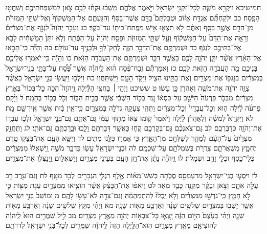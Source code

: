 \documentclass[twoside, openany, parskip=half, 11pt]{book}
\begin{document}
חמישיכא וַיִּקְרָ֥א מֹשֶׁ֛ה לְכׇל־זִקְנֵ֥י יִשְׂרָאֵ֖ל וַיֹּ֣אמֶר אֲלֵהֶ֑ם מִֽשְׁכ֗וּ וּקְח֨וּ לָכֶ֥ם צֹ֛אן לְמִשְׁפְּחֹתֵיכֶ֖ם וְשַׁחֲט֥וּ הַפָּֽסַח׃ כב וּלְקַחְתֶּ֞ם אֲגֻדַּ֣ת אֵז֗וֹב וּטְבַלְתֶּם֮ בַּדָּ֣ם אֲשֶׁר־בַּסַּף֒ וְהִגַּעְתֶּ֤ם אֶל־הַמַּשְׁקוֹף֙ וְאֶל־שְׁתֵּ֣י הַמְּזוּזֹ֔ת מִן־הַדָּ֖ם אֲשֶׁ֣ר בַּסָּ֑ף וְאַתֶּ֗ם לֹ֥א תֵצְא֛וּ אִ֥ישׁ מִפֶּֽתַח־בֵּית֖וֹ עַד־בֹּֽקֶר׃ כג וְעָבַ֣ר יְהֹוָה֮ לִנְגֹּ֣ף אֶת־מִצְרַ֒יִם֒ וְרָאָ֤ה אֶת־הַדָּם֙ עַל־הַמַּשְׁק֔וֹף וְעַ֖ל שְׁתֵּ֣י הַמְּזוּזֹ֑ת וּפָסַ֤ח יְהֹוָה֙ עַל־הַפֶּ֔תַח וְלֹ֤א יִתֵּן֙ הַמַּשְׁחִ֔ית לָבֹ֥א אֶל־בָּתֵּיכֶ֖ם לִנְגֹּֽף׃ כד וּשְׁמַרְתֶּ֖ם אֶת־הַדָּבָ֣ר הַזֶּ֑ה לְחׇק־לְךָ֥ וּלְבָנֶ֖יךָ עַד־עוֹלָֽם׃ כה וְהָיָ֞ה כִּֽי־תָבֹ֣אוּ אֶל־הָאָ֗רֶץ אֲשֶׁ֨ר יִתֵּ֧ן יְהֹוָ֛ה לָכֶ֖ם כַּאֲשֶׁ֣ר דִּבֵּ֑ר וּשְׁמַרְתֶּ֖ם אֶת־הָעֲבֹדָ֥ה הַזֹּֽאת׃ כו וְהָיָ֕ה כִּֽי־יֹאמְר֥וּ אֲלֵיכֶ֖ם בְּנֵיכֶ֑ם מָ֛ה הָעֲבֹדָ֥ה הַזֹּ֖את לָכֶֽם׃ כז וַאֲמַרְתֶּ֡ם זֶֽבַח־פֶּ֨סַח ה֜וּא לַֽיהֹוָ֗ה אֲשֶׁ֣ר פָּ֠סַ֠ח עַל־בָּתֵּ֤י בְנֵֽי־יִשְׂרָאֵל֙ בְּמִצְרַ֔יִם בְּנׇגְפּ֥וֹ אֶת־מִצְרַ֖יִם וְאֶת־בָּתֵּ֣ינוּ הִצִּ֑יל וַיִּקֹּ֥ד הָעָ֖ם וַיִּֽשְׁתַּחֲוֽוּ׃ כח וַיֵּלְכ֥וּ וַיַּֽעֲשׂ֖וּ בְּנֵ֣י יִשְׂרָאֵ֑ל כַּאֲשֶׁ֨ר צִוָּ֧ה יְהֹוָ֛ה אֶת־מֹשֶׁ֥ה וְאַהֲרֹ֖ן כֵּ֥ן עָשֽׂוּ׃
ט ששיכט וַיְהִ֣י ׀ בַּחֲצִ֣י הַלַּ֗יְלָה וַֽיהֹוָה֮ הִכָּ֣ה כׇל־בְּכוֹר֮ בְּאֶ֣רֶץ מִצְרַ֒יִם֒ מִבְּכֹ֤ר פַּרְעֹה֙ הַיֹּשֵׁ֣ב עַל־כִּסְא֔וֹ עַ֚ד בְּכ֣וֹר הַשְּׁבִ֔י אֲשֶׁ֖ר בְּבֵ֣ית הַבּ֑וֹר וְכֹ֖ל בְּכ֥וֹר בְּהֵמָֽה׃ ל וַיָּ֨קׇם פַּרְעֹ֜ה לַ֗יְלָה ה֤וּא וְכׇל־עֲבָדָיו֙ וְכׇל־מִצְרַ֔יִם וַתְּהִ֛י צְעָקָ֥ה גְדֹלָ֖ה בְּמִצְרָ֑יִם כִּֽי־אֵ֣ין בַּ֔יִת אֲשֶׁ֥ר אֵֽין־שָׁ֖ם מֵֽת׃ לא וַיִּקְרָא֩ לְמֹשֶׁ֨ה וּֽלְאַהֲרֹ֜ן לַ֗יְלָה וַיֹּ֙אמֶר֙ ק֤וּמוּ צְּאוּ֙ מִתּ֣וֹךְ עַמִּ֔י גַּם־אַתֶּ֖ם גַּם־בְּנֵ֣י יִשְׂרָאֵ֑ל וּלְכ֛וּ עִבְד֥וּ אֶת־יְהֹוָ֖ה כְּדַבֶּרְכֶֽם׃ לב גַּם־צֹאנְכֶ֨ם גַּם־בְּקַרְכֶ֥ם קְח֛וּ כַּאֲשֶׁ֥ר דִּבַּרְתֶּ֖ם וָלֵ֑כוּ וּבֵֽרַכְתֶּ֖ם גַּם־אֹתִֽי׃ לג וַתֶּחֱזַ֤ק מִצְרַ֙יִם֙ עַל־הָעָ֔ם לְמַהֵ֖ר לְשַׁלְּחָ֣ם מִן־הָאָ֑רֶץ כִּ֥י אָמְר֖וּ כֻּלָּ֥נוּ מֵתִֽים׃ לד וַיִּשָּׂ֥א הָעָ֛ם אֶת־בְּצֵק֖וֹ טֶ֣רֶם יֶחְמָ֑ץ מִשְׁאֲרֹתָ֛ם צְרֻרֹ֥ת בְּשִׂמְלֹתָ֖ם עַל־שִׁכְמָֽם׃ לה וּבְנֵי־יִשְׂרָאֵ֥ל עָשׂ֖וּ כִּדְבַ֣ר מֹשֶׁ֑ה וַֽיִּשְׁאֲלוּ֙ מִמִּצְרַ֔יִם כְּלֵי־כֶ֛סֶף וּכְלֵ֥י זָהָ֖ב וּשְׂמָלֹֽת׃ לו וַֽיהֹוָ֞ה נָתַ֨ן אֶת־חֵ֥ן הָעָ֛ם בְּעֵינֵ֥י מִצְרַ֖יִם וַיַּשְׁאִל֑וּם וַֽיְנַצְּל֖וּ אֶת־מִצְרָֽיִם׃

לז וַיִּסְע֧וּ בְנֵֽי־יִשְׂרָאֵ֛ל מֵרַעְמְסֵ֖ס סֻכֹּ֑תָה כְּשֵׁשׁ־מֵא֨וֹת אֶ֧לֶף רַגְלִ֛י הַגְּבָרִ֖ים לְבַ֥ד מִטָּֽף׃ לח וְגַם־עֵ֥רֶב רַ֖ב עָלָ֣ה אִתָּ֑ם וְצֹ֣אן וּבָקָ֔ר מִקְנֶ֖ה כָּבֵ֥ד מְאֹֽד׃ לט וַיֹּאפ֨וּ אֶת־הַבָּצֵ֜ק אֲשֶׁ֨ר הוֹצִ֧יאוּ מִמִּצְרַ֛יִם עֻגֹ֥ת מַצּ֖וֹת כִּ֣י לֹ֣א חָמֵ֑ץ כִּֽי־גֹרְשׁ֣וּ מִמִּצְרַ֗יִם וְלֹ֤א יָֽכְלוּ֙ לְהִתְמַהְמֵ֔הַּ וְגַם־צֵדָ֖ה לֹא־עָשׂ֥וּ לָהֶֽם׃ מ וּמוֹשַׁב֙ בְּנֵ֣י יִשְׂרָאֵ֔ל אֲשֶׁ֥ר יָשְׁב֖וּ בְּמִצְרָ֑יִם שְׁלֹשִׁ֣ים שָׁנָ֔ה וְאַרְבַּ֥ע מֵא֖וֹת שָׁנָֽה׃ מא וַיְהִ֗י מִקֵּץ֙ שְׁלֹשִׁ֣ים שָׁנָ֔ה וְאַרְבַּ֥ע מֵא֖וֹת שָׁנָ֑ה וַיְהִ֗י בְּעֶ֙צֶם֙ הַיּ֣וֹם הַזֶּ֔ה יָ֥צְא֛וּ כׇּל־צִבְא֥וֹת יְהֹוָ֖ה מֵאֶ֥רֶץ מִצְרָֽיִם׃ מב לֵ֣יל שִׁמֻּרִ֥ים הוּא֙ לַֽיהֹוָ֔ה לְהוֹצִיאָ֖ם מֵאֶ֣רֶץ מִצְרָ֑יִם הֽוּא־הַלַּ֤יְלָה הַזֶּה֙ לַֽיהֹוָ֔ה שִׁמֻּרִ֛ים לְכׇל־בְּנֵ֥י יִשְׂרָאֵ֖ל לְדֹרֹתָֽם׃
\end{document}

